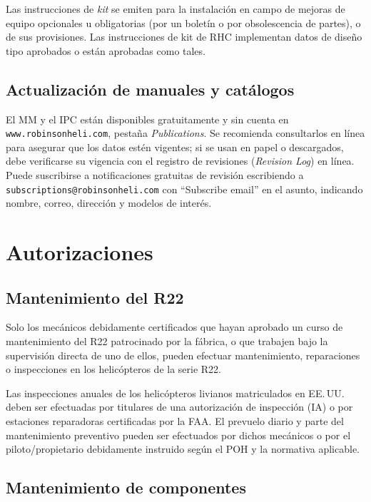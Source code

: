 Las instrucciones de \emph{kit} se emiten para la instalación en campo de mejoras de equipo opcionales u obligatorias (por un boletín o por obsolescencia de partes), o de sus provisiones. Las instrucciones de kit de RHC implementan datos de diseño tipo aprobados o están aprobadas como tales.

\subsection{Actualización de manuales y catálogos}

El MM y el IPC están disponibles gratuitamente y sin cuenta en \texttt{www.robinsonheli.com}, pestaña \emph{Publications}. Se recomienda consultarlos en línea para asegurar que los datos estén vigentes; si se usan en papel o descargados, debe verificarse su vigencia con el registro de revisiones (\emph{Revision Log}) en línea. Puede suscribirse a notificaciones gratuitas de revisión escribiendo a \texttt{subscriptions@robinsonheli.com} con ``Subscribe email'' en el asunto, indicando nombre, correo, dirección y modelos de interés.

\section{Autorizaciones}

\subsection{Mantenimiento del R22}

Solo los mecánicos debidamente certificados que hayan aprobado un curso de mantenimiento del R22 patrocinado por la fábrica, o que trabajen bajo la supervisión directa de uno de ellos, pueden efectuar mantenimiento, reparaciones o inspecciones en los helicópteros de la serie R22.

Las inspecciones anuales de los helicópteros livianos matriculados en EE.\,UU. deben ser efectuadas por titulares de una autorización de inspección (IA) o por estaciones reparadoras certificadas por la FAA. El prevuelo diario y parte del mantenimiento preventivo pueden ser efectuados por dichos mecánicos o por el piloto/propietario debidamente instruido según el POH y la normativa aplicable.

\subsection{Mantenimiento de componentes}

